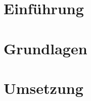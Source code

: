 \documentclass[fontsize=11pt,
		 oneside,
		 ngerman,
		 titlepage,
		 paper=a4,
		 bibliography=totoc,
		 listof=totoc,
		 DIV=10,
		 BCOR=5mm,
		 headsepline,
		 footsepline,
		 ]{scrartcl}
\begin{document}

\cleardoublepage





\tableofcontents
\clearpage

\section{Einführung}
\label{sec:Einführung}



\clearpage

\section{Grundlagen}
\label{sec:Grundlagen}

\clearpage

\clearpage

\clearpage

\clearpage

\section{Umsetzung}
\label{sec:Umsetzung}

\clearpage

\clearpage




\listoffigures
\clearpage
%

\renewcommand{\refname}{Quellenverzeichnis}



\clearpage





\mbox{}
\end{document}
